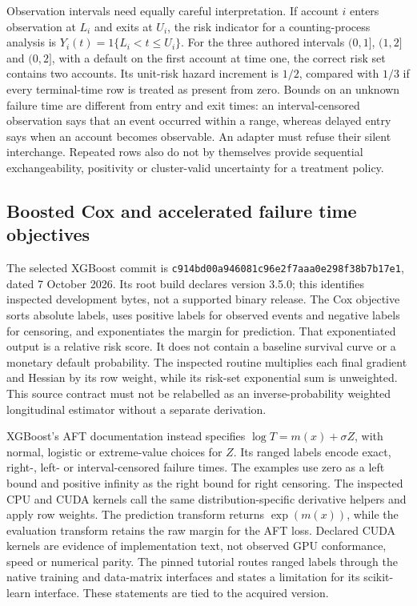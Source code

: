 Observation intervals need equally careful interpretation. If account $i$
enters observation at $L_i$ and exits at $U_i$, the risk indicator for a
counting-process analysis is $Y_i(t)=1\{L_i<t\leq U_i\}$. For the three
authored intervals $(0,1]$, $(1,2]$ and $(0,2]$, with a default on the first
account at time one, the correct risk set contains two accounts. Its unit-risk
hazard increment is $1/2$, compared with $1/3$ if every terminal-time row is
treated as present from zero. Bounds on an unknown failure time are different
from entry and exit times: an interval-censored observation says that an event
occurred within a range, whereas delayed entry says when an account becomes
observable. An adapter must refuse their silent interchange. Repeated rows also
do not by themselves provide sequential exchangeability, positivity or
cluster-valid uncertainty for a treatment policy.~\citep{exec24_longcxx_reference}

\subsection{Boosted Cox and accelerated failure time objectives}

The selected XGBoost commit is
\texttt{c914bd00a946081c96e2f7aaa0e298f38b7b17e1}, dated 7 October 2026.
Its root build declares version 3.5.0; this identifies inspected development
bytes, not a supported binary release. The Cox objective sorts absolute labels,
uses positive labels for observed events and negative labels for censoring,
and exponentiates the margin for prediction. That exponentiated output is a
relative risk score. It does not contain a baseline survival curve or a monetary
default probability. The inspected routine multiplies each final gradient and
Hessian by its row weight, while its risk-set exponential sum is unweighted.
This source contract must not be relabelled as an inverse-probability weighted
longitudinal estimator without a separate derivation.~\citep{exec24_longcxx_xgboost}

XGBoost's AFT documentation instead specifies
$\log T=m(x)+\sigma Z$, with normal, logistic or extreme-value choices for
$Z$. Its ranged labels encode exact, right-, left- or interval-censored failure
times. The examples use zero as a left bound and positive infinity as the right
bound for right censoring. The inspected CPU and CUDA kernels call the same
distribution-specific derivative helpers and apply row weights. The prediction
transform returns $\exp(m(x))$, while the evaluation transform retains the raw
margin for the AFT loss. Declared CUDA kernels are evidence of implementation
text, not observed GPU conformance, speed or numerical parity. The pinned
tutorial routes ranged labels through the native training and data-matrix
interfaces and states a limitation for its scikit-learn interface. These
statements are tied to the acquired version.~\citep{exec24_longcxx_xgboost}

